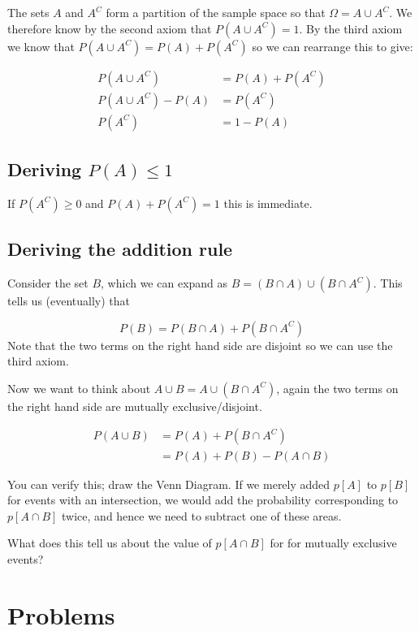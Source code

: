 \documentclass[12pt]{extbook}
\begin{document}
The sets $A$ and $A^C$ form a partition of the sample space so that $\Omega = A \cup A^C$.   We therefore know by the second axiom that $P(A \cup A^C) = 1$.   By the third axiom we know that $P(A \cup A^C) = P(A) + P(A^C)$ so we can rearrange this to give:

\begin{align*}
P(A \cup A^C) &= P(A) + P(A^C) \\
P(A \cup A^C) - P(A) &= P(A^C) \\
P(A^C) &= 1 - P(A)
\end{align*}

\subsection{Deriving $P(A) \leq 1$}

If $P(A^C) \geq 0$ and $P(A) + P(A^C) = 1$ this is immediate.

\subsection{Deriving the addition rule}

Consider the set $B$, which we can expand as $B=(B \cap A) \cup (B \cap A^C)$.   This tells us (eventually) that

\begin{displaymath}
P(B) = P(B \cap A) + P(B \cap A^C)
\end{displaymath}
Note that the two terms on the right hand side are disjoint so we can use the third axiom.

Now we want to think about $A \cup B = A \cup (B \cap A^C)$, again the two terms on the right hand side are mutually exclusive/disjoint.   

\begin{align*}
P(A \cup B) &= P(A) + P(B \cap A^C) \\
 &= P(A) + P(B) - P(A \cap B)
 \end{align*}



You can verify this; draw the Venn Diagram.   If we merely added $p[A]$ to $p[B]$ for events with an intersection, we would add the probability corresponding to $p[A \cap B]$ twice, and hence we need to subtract one of these areas.

{\color{green}What does this tell us about the value of $p[A \cap B]$ for for mutually exclusive events?}


\section{Problems}
\begin{enumerate}







\end{enumerate}
\end{document}

